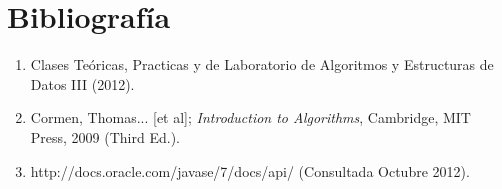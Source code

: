 \section{Bibliografía}

\begin{enumerate}
	\item Clases Teóricas, Practicas y de Laboratorio de Algoritmos y Estructuras de Datos III (2012).
	\item Cormen, Thomas... [et al]; \textit{Introduction to Algorithms}, Cambridge, MIT Press, 2009 (Third Ed.).
	\item http://docs.oracle.com/javase/7/docs/api/ (Consultada Octubre 2012).
\end{enumerate}
